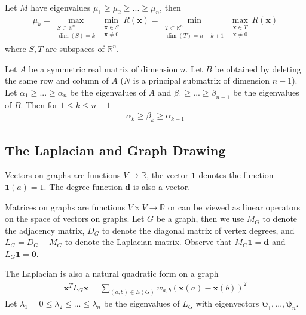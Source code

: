 \documentclass{math}
\renewcommand{\vec}[1]{\boldsymbol{#1}}
\begin{document}
\begin{theorem}
    Let $M$ have eigenvalues $\mu_1 \geq \mu_2 \geq ... \geq \mu_n$, then
    \begin{align*}
        \mu_k = \max_{\substack{S \subset \mathbb{R}^n \\ \dim(S) = k}} \min_{\substack{\vec{x} \in S \\ \vec{x} \neq 0}} R(\vec{x}) = \min_{\substack{T \subset \mathbb{R}^n \\ \dim(T) = n - k + 1}} \max_{\substack{\vec{x} \in T \\ \vec{x} \neq 0}} R(\vec{x})
    \end{align*}
    where $S, T$ are subspaces of $\mathbb{R}^n$.
\end{theorem}

\begin{theorem}
    Let $A$ be a symmetric real matrix of dimension $n$.
    Let $B$ be obtained by deleting the same row and column of $A$ ($N$ is a principal submatrix of dimension $n - 1$).
    Let $\alpha_1 \geq ... \geq \alpha_n$ be the eigenvalues of $A$ and $\beta_1 \geq ... \geq \beta_{n-1}$ be the eigenvalues of $B$.
    Then for $1 \leq k \leq n - 1$
    \begin{align*}
        \alpha_k \geq \beta_k \geq \alpha_{k + 1}
    \end{align*}
\end{theorem}

\subsection{The Laplacian and Graph Drawing}

Vectors on graphs are functions $V \to \mathbb{R}$, the vector $\vec{1}$ denotes the function $\vec{1}(a) = 1$.
The degree function $\vec{d}$ is also a vector.

Matrices on graphs are functions $V \times V \to \mathbb{R}$ or can be viewed as linear operators on the space of vectors on graphs.
Let $G$ be a graph, then we use $M_G$ to denote the adjacency matrix,
$D_G$ to denote the diagonal matrix of vertex degrees,
and $L_G = D_G - M_G$ to denote the Laplacian matrix.
Observe that $M_G \vec{1} = \vec{d}$ and $L_G \vec{1} = \vec{0}$.

The Laplacian is also a natural quadratic form on a graph
\begin{align*}
    \vec{x}^T L_G \vec{x} = \sum_{(a, b) \in E(G)} w_{a, b} (\vec{x}(a) - \vec{x}(b))^2
\end{align*}
Let $\lambda_1 = 0 \leq \lambda_2 \leq ... \leq \lambda_n$ be the eigenvalues of $L_G$ with eigenvectors $\vec{\psi}_1, ..., \vec{\psi}_n$.
\end{document}
